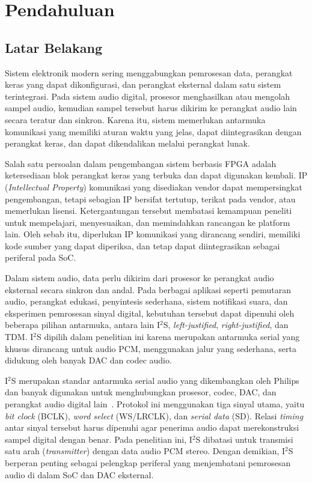 \chapter{Pendahuluan}

\section{Latar Belakang}

\hspace{1cm}Sistem elektronik modern sering menggabungkan pemrosesan data, perangkat keras yang dapat dikonfigurasi, dan perangkat eksternal dalam satu sistem terintegrasi. Pada sistem audio digital, prosesor menghasilkan atau mengolah sampel audio, kemudian sampel tersebut harus dikirim ke perangkat audio lain secara teratur dan sinkron. Karena itu, sistem memerlukan antarmuka komunikasi yang memiliki aturan waktu yang jelas, dapat diintegrasikan dengan perangkat keras, dan dapat dikendalikan melalui perangkat lunak.

\hspace{1cm}Salah satu persoalan dalam pengembangan sistem berbasis FPGA adalah ketersediaan blok perangkat keras yang terbuka dan dapat digunakan kembali. IP (\textit{Intellectual Property}) komunikasi yang disediakan vendor dapat mempersingkat pengembangan, tetapi sebagian IP bersifat tertutup, terikat pada vendor, atau memerlukan lisensi. Ketergantungan tersebut membatasi kemampuan peneliti untuk mempelajari, menyesuaikan, dan memindahkan rancangan ke platform lain. Oleh sebab itu, diperlukan IP komunikasi yang dirancang sendiri, memiliki kode sumber yang dapat diperiksa, dan tetap dapat diintegrasikan sebagai periferal pada SoC.

\hspace{1cm}Dalam sistem audio, data perlu dikirim dari prosesor ke perangkat audio eksternal secara sinkron dan andal. Pada berbagai aplikasi seperti pemutaran audio, perangkat edukasi, penyintesis sederhana, sistem notifikasi suara, dan eksperimen pemrosesan sinyal digital, kebutuhan tersebut dapat dipenuhi oleh beberapa pilihan antarmuka, antara lain I$^2$S, \textit{left-justified}, \textit{right-justified}, dan TDM. I$^2$S dipilih dalam penelitian ini karena merupakan antarmuka serial yang khusus dirancang untuk audio PCM, menggunakan jalur yang sederhana, serta didukung oleh banyak DAC dan codec audio.

\hspace{1cm}I$^2$S merupakan standar antarmuka serial audio yang dikembangkan oleh Philips dan banyak digunakan untuk menghubungkan prosesor, codec, DAC, dan perangkat audio digital lain~\citep{philips_i2s_1986}. Protokol ini menggunakan tiga sinyal utama, yaitu \textit{bit clock} (BCLK), \textit{word select} (WS/LRCLK), dan \textit{serial data} (SD). Relasi \textit{timing} antar sinyal tersebut harus dipenuhi agar penerima audio dapat merekonstruksi sampel digital dengan benar. Pada penelitian ini, I$^2$S dibatasi untuk transmisi satu arah (\textit{transmitter}) dengan data audio PCM stereo. Dengan demikian, I$^2$S berperan penting sebagai pelengkap periferal yang menjembatani pemrosesan audio di dalam SoC dan DAC eksternal.

